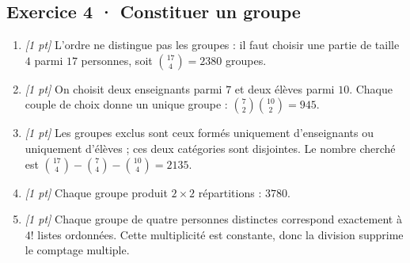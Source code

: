 \subsection*{Exercice 4 · Constituer un groupe}\begin{enumerate}

\item \textit{[1 pt]} L'ordre ne distingue pas les groupes : il faut choisir une partie de taille $4$ parmi $17$ personnes, soit $\binom{17}4=2380$ groupes.

\item \textit{[1 pt]} On choisit deux enseignants parmi $7$ et deux élèves parmi $10$. Chaque couple de choix donne un unique groupe : $\binom{7}2\binom{10}2=945$.

\item \textit{[1 pt]} Les groupes exclus sont ceux formés uniquement d'enseignants ou uniquement d'élèves ; ces deux catégories sont disjointes. Le nombre cherché est $\binom{17}4-\binom{7}4-\binom{10}4=2135$.

\item \textit{[1 pt]} Chaque groupe produit $2\times2$ répartitions : $3780$.

\item \textit{[1 pt]} Chaque groupe de quatre personnes distinctes correspond exactement à $4!$ listes ordonnées. Cette multiplicité est constante, donc la division supprime le comptage multiple.

\end{enumerate}

\fi

\fi

